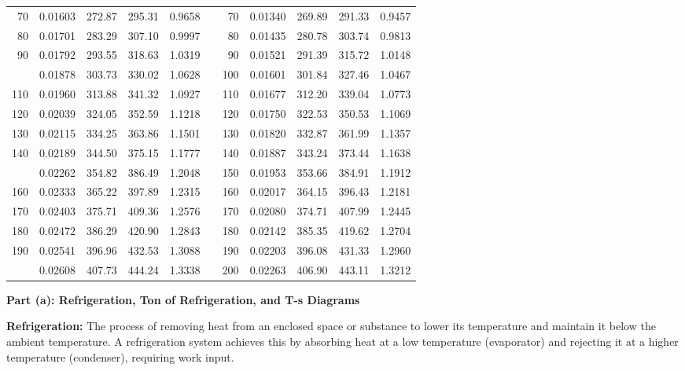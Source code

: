 \documentclass[12pt,a3paper]{article}
\begin{document}
\begin{enumerate}
\begin{center}
\begin{tabular}{r c c c c p{0.2cm} r c c c c}
70 & 0.01603 & 272.87 & 295.31 & 0.9658 & & 70 & 0.01340 & 269.89 & 291.33 & 0.9457 \\
80 & 0.01701 & 283.29 & 307.10 & 0.9997 & & 80 & 0.01435 & 280.78 & 303.74 & 0.9813 \\
90 & 0.01792 & 293.55 & 318.63 & 1.0319 & & 90 & 0.01521 & 291.39 & 315.72 & 1.0148 \\ \addlinespace
100 & 0.01878 & 303.73 & 330.02 & 1.0628 & & 100 & 0.01601 & 301.84 & 327.46 & 1.0467 \\
110 & 0.01960 & 313.88 & 341.32 & 1.0927 & & 110 & 0.01677 & 312.20 & 339.04 & 1.0773 \\
120 & 0.02039 & 324.05 & 352.59 & 1.1218 & & 120 & 0.01750 & 322.53 & 350.53 & 1.1069 \\
130 & 0.02115 & 334.25 & 363.86 & 1.1501 & & 130 & 0.01820 & 332.87 & 361.99 & 1.1357 \\
140 & 0.02189 & 344.50 & 375.15 & 1.1777 & & 140 & 0.01887 & 343.24 & 373.44 & 1.1638 \\ \addlinespace
150 & 0.02262 & 354.82 & 386.49 & 1.2048 & & 150 & 0.01953 & 353.66 & 384.91 & 1.1912 \\
160 & 0.02333 & 365.22 & 397.89 & 1.2315 & & 160 & 0.02017 & 364.15 & 396.43 & 1.2181 \\
170 & 0.02403 & 375.71 & 409.36 & 1.2576 & & 170 & 0.02080 & 374.71 & 407.99 & 1.2445 \\
180 & 0.02472 & 386.29 & 420.90 & 1.2843 & & 180 & 0.02142 & 385.35 & 419.62 & 1.2704 \\
190 & 0.02541 & 396.96 & 432.53 & 1.3088 & & 190 & 0.02203 & 396.08 & 431.33 & 1.2960 \\ \addlinespace
200 & 0.02608 & 407.73 & 444.24 & 1.3338 & & 200 & 0.02263 & 406.90 & 443.11 & 1.3212 \\
\bottomrule\bottomrule
\end{tabular}
\end{center}

\begin{tcolorbox}[enhanced,breakable,ansbox,colback=cC!4,colframe=cC,
  boxrule=0.8pt,arc=5pt,
  title={\textbf{Solution}},fonttitle=\bfseries\color{white},colbacktitle=cC]


\textbf{Part (a): Refrigeration, Ton of Refrigeration, and T-s Diagrams}

\textbf{Refrigeration:} The process of removing heat from an enclosed space
or substance to lower its temperature and maintain it below the ambient
temperature. A refrigeration system achieves this by absorbing heat at a
low temperature (evaporator) and rejecting it at a higher temperature
(condenser), requiring work input.


\end{tcolorbox}
\end{enumerate}
\end{document}
